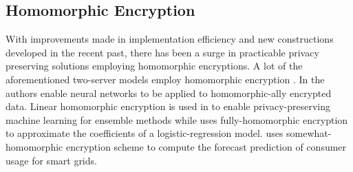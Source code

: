 \subsection{Homomorphic Encryption}
With improvements made in implementation efficiency and new constructions developed in the recent past, there has been a surge in practicable privacy preserving solutions employing homomorphic encryptions. A lot of the aforementioned two-server models employ homomorphic encryption \cite{Boneh1,Boneh2,LReg,Matrix2}.  
In \cite{CryptoDL,CryptoNet,NN} the authors enable neural networks to be applied to homomorphic-ally encrypted data.
Linear homomorphic encryption is used in \cite{Irene2} to enable privacy-preserving machine learning for ensemble methods while %
uses  fully-homomorphic encryption
to approximate the coefficients of a logistic-regression model.
\cite{grid} uses somewhat-
homomorphic encryption scheme to compute the forecast
prediction of consumer usage for smart grids. 

